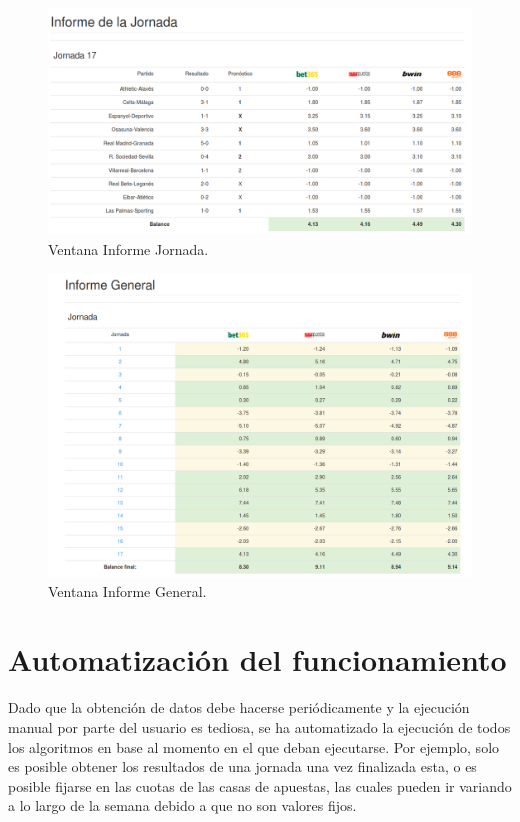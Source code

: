 \begin{figure}
\centering
\includegraphics[width=.9\textwidth]{img/drupal_inf_jornada}
\caption{Ventana Informe Jornada.}
\label{fig:infJor}
\end{figure}

\begin{figure}
\centering
\includegraphics[width=.9\textwidth]{img/drupal_inf_general_usuario}
\caption{Ventana Informe General.}
\label{fig:infGen}
\end{figure}

\section{Automatización del funcionamiento}

Dado que la obtención de datos debe hacerse periódicamente y la ejecución manual por parte del usuario es tediosa, se ha automatizado la ejecución de todos los algoritmos en base al momento en el que deban ejecutarse. Por ejemplo, solo es posible obtener los resultados de una jornada una vez finalizada esta, o es posible fijarse en las cuotas de las casas de apuestas, las cuales pueden ir variando a lo largo de la semana debido a que no son valores fijos.

